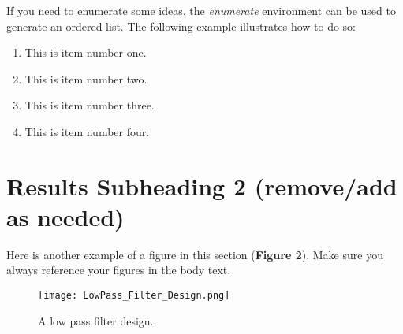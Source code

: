\indent \indent If you need to enumerate some ideas, the \textit{enumerate} environment can be used to generate an ordered list. The following example illustrates how to do so:
\vspace{-2em}
\begin{singlespace}
\begin{enumerate}
\item This is item number one.
\item This is item number two.
\item This is item number three.
\item This is item number four.
\end{enumerate}
\end{singlespace}
\vspace{-1em}
%
%

\section{Results Subheading 2 (remove/add as needed)}
\vspace{-0.4em} %


\indent\indent Here is another example of a figure in this section ({\bf Figure 2}). Make sure you always reference your figures in the body text. 

\begin{figure}[h!]
	\centering
	\texttt{[image: LowPass\_Filter\_Design.png]}
	\caption{A low pass filter design.}
\end{figure}


 





